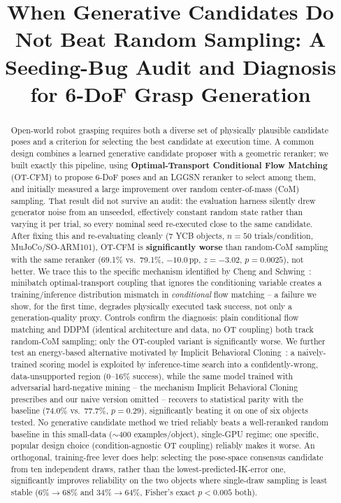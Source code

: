 \documentclass[journal]{IEEEtran}
\title{When Generative Candidates Do Not Beat Random Sampling: A Seeding-Bug
Audit and Diagnosis for 6-DoF Grasp Generation}
\begin{document}
\maketitle
\thispagestyle{empty}
\pagestyle{empty}

\begin{abstract}
Open-world robot grasping requires both a diverse set of physically plausible
candidate poses and a criterion for selecting the best candidate at execution
time.
A common design combines a learned generative candidate proposer with a
geometric reranker; we built exactly this pipeline, using
\textbf{Optimal-Transport Conditional Flow Matching} (OT-CFM) to propose
6-DoF poses and an LGGSN reranker to select among them, and initially
measured a large improvement over random center-of-mass (CoM) sampling.
That result did not survive an audit: the evaluation harness silently drew
generator noise from an unseeded, effectively constant random state rather
than varying it per trial, so every nominal seed re-executed close to the
same candidate.
After fixing this and re-evaluating cleanly (7 YCB objects, $n{=}50$
trials/condition, MuJoCo/SO-ARM101), OT-CFM is \textbf{significantly worse}
than random-CoM sampling with the same reranker (69.1\% vs.\ 79.1\%,
$-10.0$\,pp, $z{=}-3.02$, $p{=}0.0025$), not better.
We trace this to the specific mechanism identified by
Cheng and Schwing~\cite{cheng2025curse}: minibatch optimal-transport
coupling that ignores the conditioning variable creates a
training/inference distribution mismatch in \emph{conditional} flow
matching -- a failure we show, for the first time, degrades physically
executed task success, not only a generation-quality proxy.
Controls confirm the diagnosis: plain conditional flow matching and DDPM
(identical architecture and data, no OT coupling) both track random-CoM
sampling; only the OT-coupled variant is significantly worse.
We further test an energy-based alternative motivated by Implicit
Behavioral Cloning~\cite{florence2021implicit}: a naively-trained scoring
model is exploited
by inference-time search into a confidently-wrong, data-unsupported region
(0--16\% success), while the same model trained with adversarial
hard-negative mining -- the mechanism Implicit Behavioral Cloning
prescribes and our naive version omitted -- recovers to statistical parity
with the baseline (74.0\% vs.\ 77.7\%, $p{=}0.29$), significantly beating it
on one of six objects tested.
No generative candidate method we tried reliably beats a well-reranked
random baseline in this small-data ($\sim$400 examples/object), single-GPU
regime; one specific, popular design choice (condition-agnostic OT
coupling) reliably makes it worse.
An orthogonal, training-free lever does help: selecting the pose-space
consensus candidate from ten independent draws, rather than the
lowest-predicted-IK-error one, significantly improves reliability on the
two objects where single-draw sampling is least stable (6\%$\to$68\% and
34\%$\to$64\%, Fisher's exact $p<0.005$ both).
\end{abstract}
\end{document}
